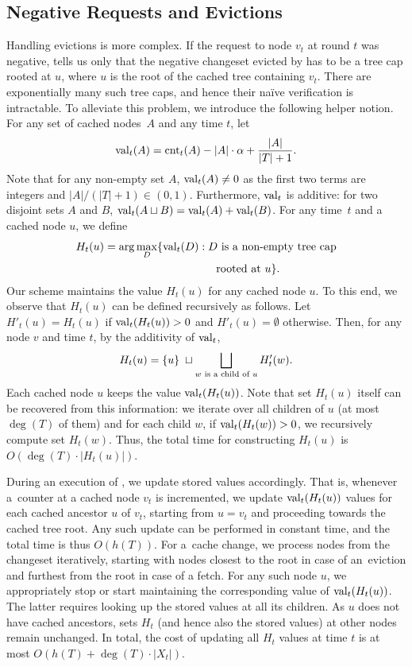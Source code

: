 \subsection{Negative Requests and Evictions}
\label{sec:implementing_negative_counters}

Handling evictions is more complex. If the request to
node $v_t$ at round $t$ was negative,
 tells us only that the negative 
changeset evicted by \ALGTC has to be a tree cap rooted at $u$, where $u$ is the
root of the cached tree containing $v_t$. There are exponentially many such
tree caps, and hence their naïve verification is intractable. To alleviate
this problem, we introduce the following helper notion. For any set of cached
nodes~$A$ and any time $t$, let
\[
  \textrm{val}_t(A) = \textrm{cnt}_t(A) - |A| \cdot \alpha + \frac{|A|}{|T|+1}.
\]
Note that for any non-empty set $A$, $\textrm{val}_t(A) \neq 0$ as the first two terms
are integers and $|A|/(|T|+1) \in (0,1)$. Furthermore, $\textrm{val}_t$ is additive:
for two disjoint sets $A$ and $B$, $\textrm{val}_t(A \sqcup B) =
\textrm{val}_t(A) + \textrm{val}_t(B)$. For any time~$t$ and a cached node $u$, we define
\begin{align*}
  H_t(u) = \arg \max_D \{ \textrm{val}_t(D) : &\; \textnormal{$D$ is a non-empty tree cap} \\
    & \quad \textnormal{rooted at $u$} \}.
\end{align*}
Our scheme maintains the value $H_t(u)$ for any cached node $u$. To this end,
we observe that $H_t(u)$ can be defined recursively as follows. Let
$H'_t(u) = H_t(u)$ if $\textrm{val}_t(H_t(u)) > 0$ and $H'_t(u) = \emptyset$ otherwise.
Then, for any node $v$ and time $t$, by the additivity of $\textrm{val}_t$, 
\begin{equation*}
\label{eq:h_t_recurrence}
  H_t(u) = \{ u \} \; \sqcup \bigsqcup_\textnormal{$w$ is a child of $u$} H'_t(w).
\end{equation*}
Each cached node $u$ keeps the value $\textrm{val}_t(H_t(u))$. Note that set $H_t(u)$
itself can be recovered from this information: we iterate over all children of
$u$ (at most $\deg(T)$ of them) and for each child $w$, if $\textrm{val}_t(H_t(w)) >
0$, we recursively compute set $H_t(w)$. Thus, the total time for constructing
$H_t(u)$ is $O(\deg(T) \cdot |H_t(u)|)$.

During an execution of \ALGTC, we update stored values accordingly.
That is, whenever a~counter at a cached node $v_t$ is incremented, we update
$\textrm{val}_t(H_t(u))$ values for each cached ancestor $u$ of $v_t$, starting from
\mbox{$u = v_t$} and proceeding towards the cached tree root. Any such update can be
performed in constant time, and the total time is thus $O(h(T))$. For a~cache
change, we process nodes from the changeset iteratively, starting with nodes
closest to the root in case of an~eviction and furthest from the root in case
of a fetch. For any such node $u$, we appropriately stop or start maintaining
the corresponding value of $\textrm{val}_t(H_t(u))$. The latter requires looking up the
stored values at all its children. As $u$ does not have cached
ancestors, sets $H_t$ (and hence also the stored values) at other nodes 
remain unchanged. In total, the
cost of updating all $H_t$ values at time $t$ is at most $O(h(T) + \deg(T)
\cdot |X_t|)$.


